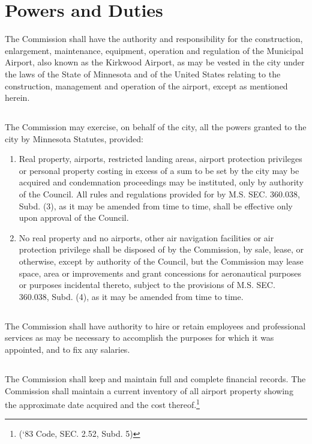 \section{Powers and Duties}
The Commission shall have the authority and responsibility for the construction, enlargement, maintenance, equipment, operation and regulation of the Municipal Airport, also known as the Kirkwood Airport, as may be vested in the city under the laws of the State of Minnesota and of the United States relating to the construction, management and operation of the airport, except as mentioned herein.
\subsection{}
The Commission may exercise, on behalf of the city, all the powers granted to the city by Minnesota Statutes, provided:
\begin{enumerate}
    \item Real property, airports, restricted landing areas, airport protection privileges or personal property costing in excess of a sum to be set by the city may be acquired and condemnation proceedings may be instituted, only by authority of the Council.  All rules and regulations provided for by M.S. SEC. 360.038, Subd. (3), as it may be amended from time to time, shall be effective only upon approval of the Council.
    \item No real property and no airports, other air navigation facilities or air protection privilege shall be disposed of by the Commission, by sale, lease, or otherwise, except by authority of the Council, but the Commission may lease space, area or improvements and grant concessions for aeronautical purposes or purposes incidental thereto, subject to the provisions of M.S. SEC. 360.038, Subd. (4), as it may be amended from time to time.
\end{enumerate}
\subsection{}
The Commission shall have authority to hire or retain employees and professional services as may be necessary to accomplish the purposes for which it was appointed, and to fix any salaries.
\subsection{}
The Commission shall keep and maintain full and complete financial records.  The Commission shall maintain a current inventory of all airport property showing the approximate date acquired and the cost thereof.\footnote{(‘83 Code, SEC. 2.52, Subd. 5)}


